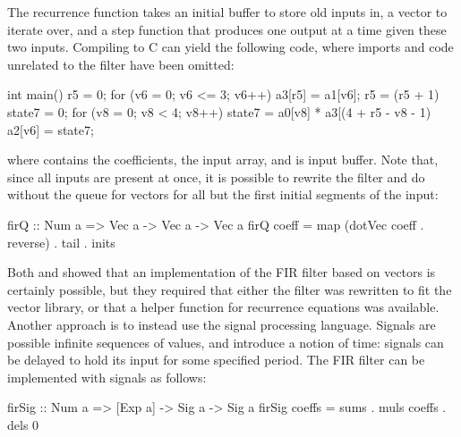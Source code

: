 \documentclass[../paper.tex]{subfiles}
\begin{document}
\noindent The recurrence function takes an initial buffer to store old inputs in, a vector to iterate over, and a step function that produces one output at a time given these two inputs. Compiling  to C can yield the following code, where imports and code unrelated to the filter have been omitted:

\begin{code}
int main() {    
  r5 = 0;
  for (v6 = 0; v6 <= 3; v6++) {
    a3[r5] = a1[v6];
    r5 = (r5 + 1) %
    state7 = 0;
    for (v8 = 0; v8 < 4; v8++)
      state7 = a0[v8] * a3[(4 + r5 - v8 - 1) %
    a2[v6] = state7;
  }
}
\end{code}

\noindent where  contains the coefficients,  the input array, and  is input buffer. Note that, since all inputs are present at once, it is possible to rewrite the filter and do without the queue for vectors for all but the first initial segments of the input:

\begin{code}
firQ :: Num a => Vec a -> Vec a -> Vec a
firQ coeff = map (dotVec coeff . reverse) . tail . inits
\end{code}


Both  and  showed that an implementation of the FIR filter based on vectors is certainly possible, but they required that either the filter was rewritten to fit the vector library, or that a helper function for recurrence equations was available. Another approach is to instead use the signal processing language. Signals are possible infinite sequences of values, and introduce a notion of time: signals can be delayed to hold its input for some specified period. The FIR filter can be implemented with signals as follows:

\begin{code}
firSig :: Num a => [Exp a] -> Sig a -> Sig a
firSig coeffs = sums . muls coeffs . dels 0
\end{code}
\end{document}
